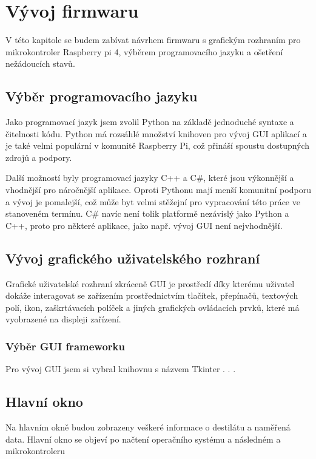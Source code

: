 \chapter{Vývoj firmwaru}
V této kapitole se budem zabívat návrhem firmwaru s grafickým rozhraním pro mikrokontroler Raspberry pi 4, výběrem programovacího jazyku a ošetření nežádoucích stavů.

\section{Výběr programovacího jazyku}
Jako programovací jazyk jsem zvolil Python na základě jednoduché syntaxe a čitelnosti kódu. Python má rozsáhlé množství knihoven pro vývoj GUI aplikací a je také velmi populární v komunitě Raspberry Pi, což přináší spoustu dostupných zdrojů a podpory.

Další možností byly programovací jazyky C++ a C\#, které jsou výkonnější a vhodnější pro náročnější aplikace. Oproti Pythonu mají menší komunitní podporu a vývoj je pomalejší, což může byt velmi stěžejní pro vypracování této práce ve stanoveném termínu. C\# navíc není tolik platformě nezávislý jako Python a C++, proto pro některé aplikace, jako např. vývoj GUI není nejvhodnější.



\section{Vývoj grafického uživatelského rozhraní}

Grafické uživatelské rozhraní zkráceně GUI je prostředí díky kterému uživatel dokáže interagovat se zařízením prostřednictvím tlačítek, přepínačů, textových polí, ikon, zaškrtávacích políček a jiných grafických ovládacích prvků, které má vyobrazené na displeji zařízení.

\subsection{Výběr GUI frameworku}
Pro vývoj GUI jsem si vybral knihovnu s názvem Tkinter
.
.
.

\section{Hlavní okno}

Na hlavním okně budou zobrazeny veškeré informace o destilátu a naměřená data. Hlavní okno se objeví po načtení operačního systému a následném a mikrokontroleru

